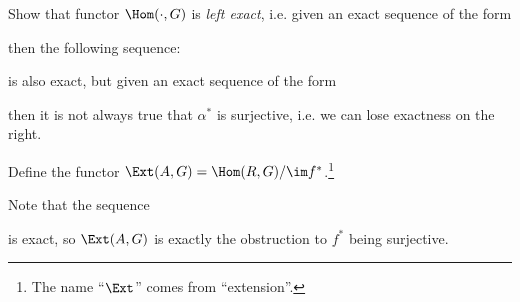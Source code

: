 \begin{exercise}
  Show that functor
  $\Hom(\cdot, G)$ is \emph{left exact},
  i.e. given an exact sequence of the form
  \begin{center}
  \end{center}
  then the following sequence:
  \begin{center}
  \end{center}
  is also exact, but given an exact sequence of
  the form
  \begin{center}
  \end{center}
  then it is not always true that $\alpha^*$ is
  surjective, i.e. we can lose exactness on the
  right.
\end{exercise}

\begin{definition}
  Define the functor
  $\Ext(A, G) = \Hom(R, G) / {\im f^*}$.\footnote{The name ``$\Ext$'' comes from ``extension''.}
\end{definition}

\begin{remark}
  Note that the sequence
  \begin{center}
  \end{center}
  is exact, so $\Ext(A, G)$ is exactly the
  obstruction to $f^*$ being surjective.
\end{remark}


